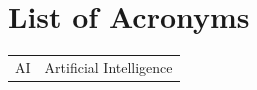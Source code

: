 \chapter*{List of Acronyms}

\begin{table}[ht!]
		\begin{tabular}{ll}
		AI & Artificial Intelligence \\
		\end{tabular}
\end{table}

